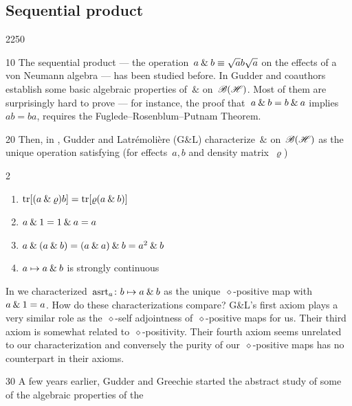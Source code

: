 \subsection{Sequential product}
\begin{parsec}{2250}%
\begin{point}{10}%
The sequential product --- the
    operation~$a \mathbin{\&} b \equiv \sqrt{a}b\sqrt{a}$
    on the effects of a von Neumann algebra
    --- has been studied before.
In \cite{gudder2001sequential,gheondea2004sequential}
    Gudder and coauthors establish some basic algebraic properties of~$\&$
    on~$\mathscr{B}(\mathscr{H})$.
Most of them are surprisingly hard to prove ---
    for instance, the proof that~$a \mathbin{\&} b=b \mathbin{\&} a$
    implies~$ab = ba$, requires
    the Fuglede--Rosenblum--Putnam Theorem.
\begin{point}{20}%
Then, in \cite{gudder2008characterization},
    Gudder and Latr\'emoli\`ere (G\&L)
    characterize~$\&$ on~$\mathscr{B}(\mathscr{H})$ as the unique operation satisfying
    (for effects~$a,b$ and density matrix~$\varrho$)
\begin{multicols}{2}
\begin{enumerate}
    \item $\mathop{\mathrm{tr}} [ (a \mathbin{\&} \varrho) b] = \mathop{\mathrm{tr}} [\varrho
                    (a \mathbin{\&} b)]$
    \item $a \mathbin{\&} 1 = 1 \mathbin{\&} a = a$
    \item $ a \mathbin{\&} (a \mathbin{\&} b) =
            (a \mathbin{\&} a) \mathbin{\&} b =
            a^2 \mathbin{\&} b$
        \item $a \mapsto a \mathbin{\&} b$ is strongly continuous
\end{enumerate}    
\end{multicols}
\noindent
In  we characterized~$\mathrm{asrt}_a \colon b \mapsto a \mathbin{\&} b$
    as the unique~$\diamond$-positive map with~$a \mathbin{\&} 1 = a$.
How do these characterizations compare?
G\&L's first axiom plays a very similar role
        as the~$\diamond$-self adjointness of~$\diamond$-positive maps for us.
Their third axiom is somewhat related to~$\diamond$-positivity.
Their fourth axiom seems unrelated to our characterization
    and conversely the purity of our~$\diamond$-positive maps
    has no counterpart in their axioms.
\end{point}
\begin{point}{30}%
A few years earlier, Gudder and Greechie started
    \cite{gudder2001sequential}
    the abstract study of some of the algebraic properties of the

\end{point}
\end{point}
\end{parsec}
